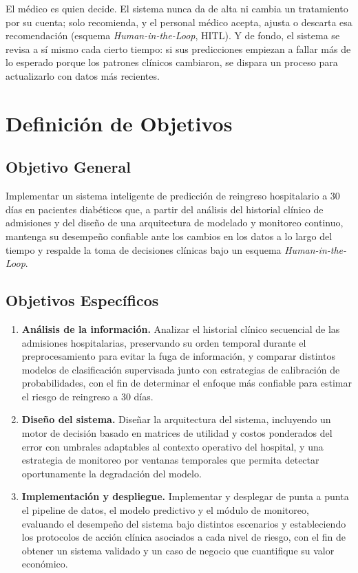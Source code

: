 \documentclass[11pt,a4paper]{article}
\begin{document}
El médico es quien decide. El sistema nunca da de alta ni cambia un tratamiento por su cuenta; solo recomienda, y el personal médico acepta, ajusta o descarta esa recomendación (esquema \emph{Human-in-the-Loop}, HITL). Y de fondo, el sistema se revisa a sí mismo cada cierto tiempo: si sus predicciones empiezan a fallar más de lo esperado porque los patrones clínicos cambiaron, se dispara un proceso para actualizarlo con datos más recientes.

\section{Definición de Objetivos}

\subsection{Objetivo General}
Implementar un sistema inteligente de predicción de reingreso hospitalario a 30 días en pacientes diabéticos que, a partir del análisis del historial clínico de admisiones y del diseño de una arquitectura de modelado y monitoreo continuo, mantenga su desempeño confiable ante los cambios en los datos a lo largo del tiempo y respalde la toma de decisiones clínicas bajo un esquema \emph{Human-in-the-Loop}.

\subsection{Objetivos Específicos}
\begin{enumerate}[leftmargin=*]
    \item \textbf{Análisis de la información.} Analizar el historial clínico secuencial de las admisiones hospitalarias, preservando su orden temporal durante el preprocesamiento para evitar la fuga de información, y comparar distintos modelos de clasificación supervisada junto con estrategias de calibración de probabilidades, con el fin de determinar el enfoque más confiable para estimar el riesgo de reingreso a 30 días.
    \item \textbf{Diseño del sistema.} Diseñar la arquitectura del sistema, incluyendo un motor de decisión basado en matrices de utilidad y costos ponderados del error con umbrales adaptables al contexto operativo del hospital, y una estrategia de monitoreo por ventanas temporales que permita detectar oportunamente la degradación del modelo.
    \item \textbf{Implementación y despliegue.} Implementar y desplegar de punta a punta el pipeline de datos, el modelo predictivo y el módulo de monitoreo, evaluando el desempeño del sistema bajo distintos escenarios y estableciendo los protocolos de acción clínica asociados a cada nivel de riesgo, con el fin de obtener un sistema validado y un caso de negocio que cuantifique su valor económico.
\end{enumerate}
\end{document}
